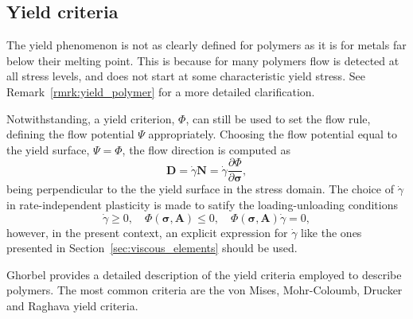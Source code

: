 
\subsection{Yield criteria}
\label{sec:yield_criteria}

The yield phenomenon is not as clearly defined for polymers as it is for metals far below their melting point.
This is because for many polymers flow is detected at all stress levels, and does not start at some characteristic yield stress.
See Remark~\ref{rmrk:yield_polymer} for a more detailed clarification.

Notwithstanding, a yield criterion, $\Phi$, can still be used to set the flow rule, defining the flow potential $\Psi$ appropriately.
Choosing the flow potential equal to the yield surface, $\Psi = \Phi$, the flow direction is computed as
\begin{equation}
	\mathbf D = \dot \gamma \mathbf N = \dot \gamma \frac{\partial \Phi}{\partial \bm \sigma},
\end{equation}
being perpendicular to the the yield surface in the stress domain.
The choice of $\dot \gamma$ in rate-independent plasticity is made to satify the loading-unloading conditions
\begin{equation}
	\dot\gamma \geq 0,\quad \Phi(\bm \sigma, \mathbf A) \leq 0,\quad \Phi(\bm \sigma, \mathbf A) \dot \gamma = 0,
\end{equation}
however, in the present context, an explicit expression for $\dot \gamma$ like the ones presented in Section~\ref{sec:viscous_elements} should be used.

Ghorbel \citep{ghorbelViscoplasticConstitutiveModel2008} provides a detailed description of the yield criteria employed to describe polymers.
The most common criteria are the von Mises, Mohr-Coloumb, Drucker and Raghava yield \citep{balieuNonassociatedViscoplasticityCoupled2014} criteria.

%

